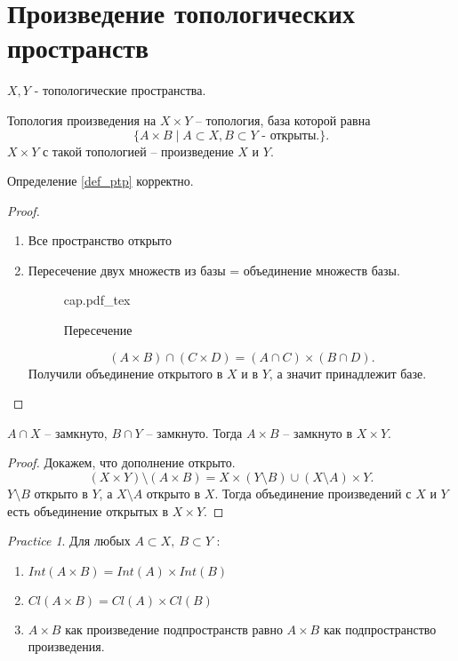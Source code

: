 \documentclass[11pt]{book}
\newcommand{\incfig}[1]{%
    \def\svgwidth{\columnwidth}
    {#1.pdf_tex}
}
\theoremstyle{definition}
\theoremstyle{plain}
\theoremstyle{plain}
\theoremstyle{definition}
\theoremstyle{remark}
\newtheorem*{prac}{Practice}
\begin{document}
\section{Произведение топологических пространств}
\begin{defn}\label{def_ptp}
    $X, Y$ - топологические пространства.

    Топология произведения на $X \times Y$ -- топология, база которой равна 
    \[
    \{A \times B \mid A \subset X, B \subset Y \mbox{ - открыты.}\}
    .\] 
    $X \times Y$ с такой топологией -- произведение $X$ и $Y$.
\end{defn}
\begin{thm}
    Определение \ref{def_ptp} корректно.
\end{thm}
\begin{proof}
    \begin{enumerate}
        \item Все пространство открыто
	\item Пересечение двух множеств из базы = объединение множеств базы.
\begin{figure}[ht]
    \centering
    \incfig{cap}
    \caption{Пересечение}
    \label{fig:cap}
\end{figure}
\[
    (A \times B) \cap (C \times D) = (A \cap C) \times (B \cap D)
.\] 
Получили объединение открытого в $X$ и в $Y$, а значит принадлежит базе.
    \end{enumerate}
\end{proof}
\begin{thm}
    $A \cap X$ -- замкнуто, $B \cap Y$ -- замкнуто. Тогда $A \times B $ -- замкнуто в $X \times Y$.
\end{thm}
\begin{proof}
    Докажем, что дополнение открыто.
    \[
	(X \times Y) \setminus(A \times B) = X \times (Y \setminus B) \cup (X \setminus A) \times Y
    .\] 
$Y \setminus B$ открыто в $Y$, а $X \setminus A$ открыто в $X$. Тогда объединение произведений с $X$ и $Y$ есть объединение открытых в $X \times Y$.
\end{proof}
\begin{prac}
    Для любых $A \subset X, ~ B \subset Y$ :
    \begin{enumerate}
	\item $Int (A \times B) = Int(A) \times Int(B)$
	\item  $Cl (A \times B) = Cl(A) \times Cl(B)$
	\item  $A \times B$  как произведение подпространств равно $A \times B$ как подпространство произведения.
    \end{enumerate}
\end{prac}
\end{document}
